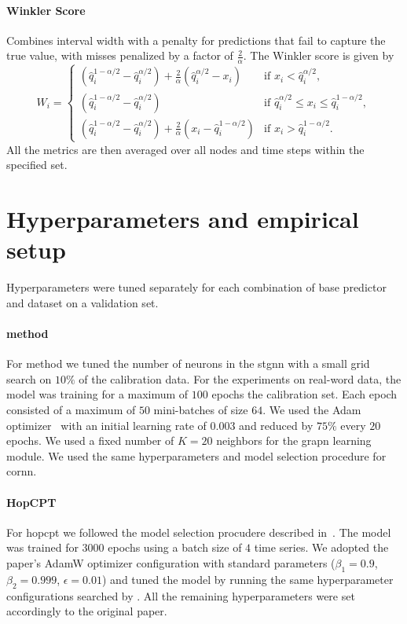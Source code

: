 \paragraph{Winkler Score} Combines interval width with a penalty for predictions that fail to capture the true value, with misses penalized by a factor of $\frac{2}{\alpha}$. The Winkler score is given by
\begin{equation}
    W_i = \begin{cases}
        (\hat{q}^{1-\alpha/2}_i - \hat{q}^{\alpha/2}_i) + \frac{2}{\alpha}(\hat{q}^{\alpha/2}_i - x_i) & \text{if } x_i < \hat{q}^{\alpha/2}_i, \\
        (\hat{q}^{1-\alpha/2}_i - \hat{q}^{\alpha/2}_i) & \text{if } \hat{q}^{\alpha/2}_i \leq x_i \leq \hat{q}^{1-\alpha/2}_i, \\
        (\hat{q}^{1-\alpha/2}_i - \hat{q}^{\alpha/2}_i) + \frac{2}{\alpha}(x_i - \hat{q}^{1-\alpha/2}_i) & \text{if } x_i > \hat{q}^{1-\alpha/2}_i.
    \end{cases}
\end{equation}
All the metrics are then averaged over all nodes and time steps within the specified set.

\section{Hyperparameters and empirical setup}

Hyperparameters were tuned separately for each combination of base predictor and dataset on a validation set.

\paragraph{\gls{method}} For \gls{method} we tuned the number of neurons in the \gls{stgnn} with a small grid search on $10\%$ of the calibration data. For the experiments on real-word data, the model was training for a maximum of $100$ epochs the calibration set. Each epoch consisted of a maximum of $50$ mini-batches of size $64$. We used the Adam optimizer~\cite{kingma2014adam} with an initial learning rate of $0.003$ and reduced by $75\%$ every $20$ epochs. We used a fixed number of $K=20$ neighbors for the grapn learning module. We used the same hyperparameters and model selection procedure for \gls{cornn}.

\paragraph{HopCPT }  For \gls{hopcpt} we followed the model selection procudere described in~\cite{auer2023conformal}. 
The model was trained for $3000$ epochs using a batch size of $4$ time series. We adopted the paper's AdamW optimizer configuration with standard parameters ($\beta_1 = 0.9$, $\beta_2 = 0.999$, $\epsilon = 0.01$) and tuned the model by running the same hyperparameter configurations searched by \cite{auer2023conformal}. All the remaining hyperparameters were set accordingly to the original paper. 

